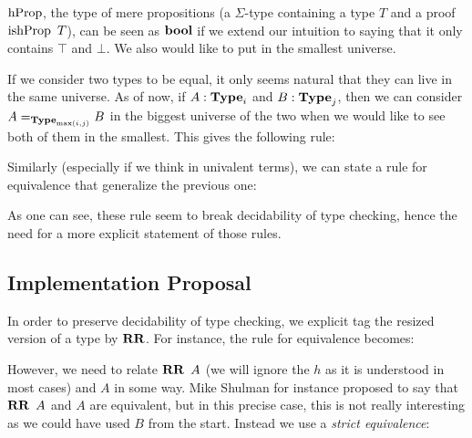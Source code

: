 \documentclass[11pt]{article}
\theoremstyle{plain}
\theoremstyle{remark}
\begin{document}
$\operatorname{hProp}$, the type of mere propositions (a $\Sigma$-type containing a type $T$
and a proof $\operatorname{ishProp}\ T$), can be seen as $\operatorname{\mathbf{bool}}$ if we extend our intuition
to saying that it only contains $\top$ and $\bot$. We also would like to put in
the smallest universe.

\begin{mathc}
\end{mathc}

If we consider two types to be equal, it only seems natural that they can live
in the same universe. As of now, if $A : \operatorname{\mathbf{Type}}_i$ and $B : \operatorname{\mathbf{Type}}_j$, then we
can consider $A =_{\operatorname{\mathbf{Type}}_{\max(i,j)}} B$ in the biggest universe of the two
when we would like to see both of them in the smallest.
This gives the following rule:

\begin{mathc}
\end{mathc}

Similarly (especially if we think in univalent terms), we can state a rule for
equivalence that generalize the previous one:

\begin{mathc}
\end{mathc}

As one can see, these rule seem to break decidability of type checking, hence
the need for a more explicit statement of those rules.

\subsection{Implementation Proposal}

In order to preserve decidability of type checking, we explicit tag the resized
version of a type by $\operatorname{\mathbf{RR}}$. For instance, the rule for equivalence becomes:

\begin{mathc}
\end{mathc}

\noindent
However, we need to relate $\operatorname{\mathbf{RR}}\ A$ (we will ignore the $h$ as it is understood
in most cases) and $A$ in some way. Mike Shulman for instance proposed to say
that $\operatorname{\mathbf{RR}}\ A$ and $A$ are equivalent, but in this precise case, this is not
really interesting as we could have used $B$ from the start.
Instead we use a \emph{strict equivalence}:
\end{document}
